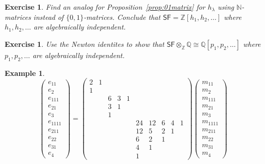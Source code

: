 \documentclass[12pt]{article}
\theoremstyle{plain}
\newtheorem{exercise}[theorem]{Exercise}
\theoremstyle{definition}
\newtheorem{example}[theorem]{Example}
\theoremstyle{remark}
\numberwithin{equation}{section}
\begin{document}
\begin{exercise}
Find an analog for Proposition~\ref{prop:01matrix} for $h_\lambda$
using $\mathbb{N}$-matrices instead of $\{0,1\}$-matrices.
Conclude that 
$\mathsf{SF} = \mathbb{Z}[h_1,h_2,\ldots]$
where $h_1,h_2,\ldots$ are algebraically independent.
\end{exercise}

\begin{exercise}
Use the Newton identites to show that 
$\mathsf{SF} \otimes_{\mathbb{Z}} \mathbb{Q} \cong \mathbb{Q}[p_1,p_2,\ldots]$
where $p_1,p_2,\ldots$ are algebraically independent.
\end{exercise}

\begin{example}
\[
\begin{pmatrix} e_{11}\\ e_2\\ e_{111}\\ e_{21}\\ e_3\\
e_{1111}\\ e_{211} \\ e_{22}\\ e_{31}\\ e_4
\end{pmatrix}
=
\begin{pmatrix}
2 & 1 &
 & & &
& & & & \\
1 & &
 & & &
& & & & \\
 & &
6 & 3 & 1 &
& & & & \\
 & &
3 & 1 & &
& & & & \\
 & &
1 & & &
& & & & \\
 & &
 & & &
24 & 12 & 6 & 4 & 1 \\
 & &
 & & &
12 & 5 & 2 & 1 & \\
 & &
 & & &
6 & 2 & 1 & & \\
 & &
 & & &
4 & 1 & & & \\
 & &
 & & &
1 & & & &
\end{pmatrix} 
\begin{pmatrix} m_{11}\\ m_2\\ m_{111}\\ m_{21}\\ m_3\\
m_{1111}\\ m_{211} \\ m_{22}\\ m_{31}\\ m_4
\end{pmatrix}
\]
\end{example}
\end{document}
